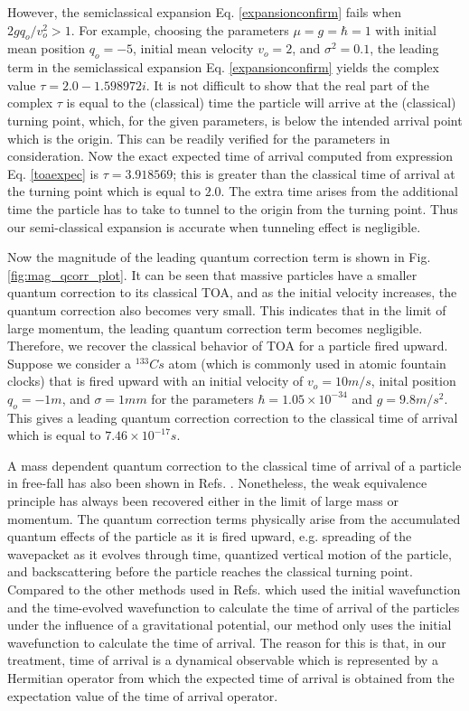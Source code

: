 \documentclass[%
 reprint,
 amsmath,amssymb,
 aps,
]{revtex4-1}
\begin{document}
However, the semiclassical expansion Eq. \eqref{expansionconfirm} fails when $2g q_o /v_o^2 > 1$. For example, choosing the parameters $\mu=g=\hbar=1$ with initial mean position $q_o=-5$, initial mean velocity $v_o=2$, and $\sigma^2=0.1$, the leading term in the semiclassical expansion Eq. \eqref{expansionconfirm} yields the complex value $\tau=2.0-1.598972i$. It is not difficult to show that the real part of the complex $\tau$ is equal to the (classical) time the particle will arrive at the (classical) turning point, which, for the given parameters, is below the intended arrival point which is the origin. This can be readily verified for the parameters in consideration. Now the exact expected time of arrival computed %
from expression Eq. \eqref{toaexpec} is $\tau=3.918569$; this is greater than the classical time of arrival at the turning point which is equal to $2.0$. The extra time arises from the additional time the particle has to take to tunnel to the origin from the turning point. Thus our semi-classical expansion is accurate when tunneling effect is negligible.  

Now the magnitude of the leading quantum correction term is shown in Fig. \ref{fig:mag_qcorr_plot}. It can be seen that massive particles have a smaller quantum correction to its classical TOA, and as the initial velocity increases, the quantum correction also becomes very small. This indicates that in the limit of large momentum, the leading quantum correction term becomes negligible. Therefore, we recover the classical behavior of TOA for a particle fired upward. Suppose we consider a ${^{133}}Cs$ atom (which is commonly used in atomic fountain clocks) that is fired upward with an initial velocity of $v_o=10 m/s$, inital position $q_o=-1 m$, and $\sigma=1 mm$ for the parameters $\hbar=1.05\times 10^{-34}$ and $g=9.8m/s^2$. This gives a leading quantum correction correction to the classical time of arrival which is equal to $7.46\times 10^{-17} s$. 

A mass dependent quantum correction to the classical time of arrival of a particle in free-fall has also been shown in Refs. \cite{mousavi2015,chowdhury2012,viola1997,davies2004a,ali2006}. Nonetheless, the weak equivalence principle has always been recovered either in the limit of large mass or momentum. The quantum correction terms physically arise from the accumulated quantum effects of the particle as it is fired upward, e.g. spreading of the wavepacket as it evolves through time, quantized vertical motion of the particle, and backscattering before the particle reaches the classical turning point. Compared to the other methods used in Refs. \cite{mousavi2015,chowdhury2012,viola1997,davies2004a,ali2006} which used the initial wavefunction and the time-evolved wavefunction to calculate the time of arrival of the particles under the influence of a gravitational potential, our method only uses the initial wavefunction to calculate the time of arrival. The reason for this is that, in our treatment, time of arrival is a dynamical observable which is represented by a Hermitian operator from which the expected time of arrival is obtained from the expectation value of the time of arrival operator. 
\end{document}
